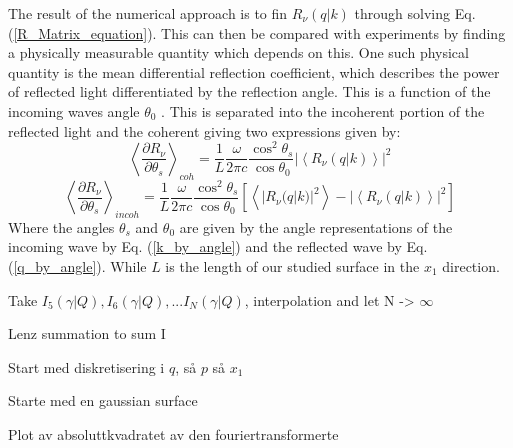 \documentclass[../main.tex]{subfiles}
\begin{document}
The result of the numerical approach is to fin $R_\nu(q|k)$ through solving Eq. (\ref{R_Matrix_equation}). This can then be compared with experiments by finding a physically measurable quantity which depends on this. One such physical quantity is the mean differential reflection coefficient, which describes the power of reflected light differentiated by the reflection angle. This is a function of the incoming waves angle $\theta_0$ \cite{Simonsen2010}. This is separated into the incoherent portion of the reflected light and the coherent giving two expressions given by:
\begin{equation}
    \left\langle \frac{\partial R_\nu}{\partial \theta_s}\right\rangle_{coh} = \frac{1}{L}\frac{\omega}{2\pi c}\frac{\cos^2 \theta_s}{\cos \theta_0} |\left\langle R_\nu(q|k) \right\rangle|^2
\label{DRC_coh}
\end{equation}
\begin{equation}
    \left\langle \frac{\partial R_\nu}{\partial \theta_s}\right\rangle_{incoh} = \frac{1}{L}\frac{\omega}{2\pi c}\frac{\cos^2 \theta_s}{\cos \theta_0} \left[ \left\langle |R_\nu (q|k) |^2 \right\rangle - |\left\langle R_\nu(q|k) \right\rangle|^2 \right]
\label{DRC_incoh}
\end{equation}
Where the angles $\theta_s$ and $\theta_0$ are given by the angle representations of the incoming wave by Eq. (\ref{k_by_angle}) and the reflected wave by Eq. (\ref{q_by_angle}). While $L$ is the length of our studied surface in the $x_1$ direction. 

Take $I_5(\gamma|Q), I_6(\gamma|Q), ... I_N(\gamma|Q)$, interpolation and let N -> $\infty$

Lenz summation to sum I

Start med diskretisering i $q$, så $p$ så $x_1$

Starte med en gaussian surface


Plot av absoluttkvadratet av den fouriertransformerte
\end{document}
